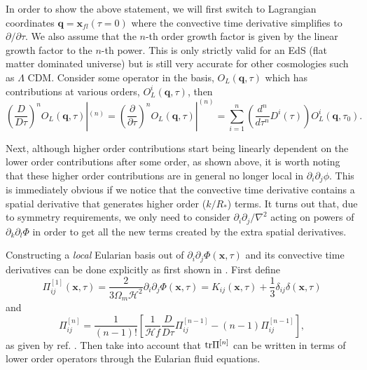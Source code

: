 \documentclass[11pt]{book}
\DeclareRobustCommand{\tr}{\ifmmode\text{tr}\else d\fi}
\newcommand{\br}[1]{\ensuremath{\left( #1 \right)}}
\newcommand{\sbr}[1]{\ensuremath{\left[ #1 \right]}}
\begin{document}
In order to show the above statement, we will first switch to Lagrangian coordinates $\mathbf q = \mathbf x_{fl}(\tau=0)$ where the convective time derivative simplifies to $\partial/\partial \tau$. We also assume that the $n$-th order growth factor is given by the linear growth factor to the $n$-th power. This is only strictly valid for an EdS (flat matter dominated universe) but is still very accurate for other cosmologies such as $\Lambda$ CDM. %
Consider some operator in the basis, $O_L(\mathbf q, \tau)$ which has contributions at various orders, $O_L^i(\mathbf q, \tau)$, then
\begin{equation}
    \br{\frac{D}{D\tau}}^n O_L(\mathbf q, \tau)|^{(n)} = \br{\frac{\partial}{\partial\tau}}^n O_L(\mathbf q, \tau)|^{(n)} = \sum_{i = 1}^n \br{\frac{d^n}{d\tau^n}D^i(\tau)}O^{i}_{L}(\mathbf q, \tau_0).
\end{equation}

Next, although higher order contributions start being linearly dependent on the lower order contributions after some order, as shown above, it is worth noting that these higher order contributions are in general no longer local in $\partial_i\partial_j \phi$. This is immediately obvious if we notice that the convective time derivative contains a spatial derivative that generates higher order ($k/R_*$) terms. It turns out that, due to symmetry requirements, we only need to consider $\partial_i \partial_j / \nabla ^2$ acting on powers of $\partial_k \partial_l \Phi$ in order to get all the new terms created by the extra spatial derivatives. %

Constructing a \emph{local} Eularian basis out of $\partial_i\partial_j\Phi(\mathbf x, \tau)$ and its convective time derivatives can be done explicitly as first shown in \cite{Mirbabayi_2015}. First define
\begin{equation}
    \Pi^{[1]}_{ij}(\mathbf x, \tau) = \frac{2}{3\Omega_m\mathcal H^2}\partial_i\partial_j\Phi(\mathbf x, \tau) = K_{ij}(\mathbf x, \tau) + \frac{1}{3}\delta_{ij}\delta(\mathbf x, \tau)
\end{equation}
and
\begin{equation}
    \Pi^{[n]}_{ij} = \frac{1}{(n-1)!}\sbr{ \frac{1}{\mathcal H f}\frac{D}{D\tau} \Pi^{[n-1]}_{ij} - (n-1)\Pi^{[n-1]}_{ij}},
\end{equation}
as given by ref. \cite{Mirbabayi_2015}. Then take into account that $\tr \Pi^{[n]}$ can be written in terms of lower order operators through the Eularian fluid equations. %
\end{document}
